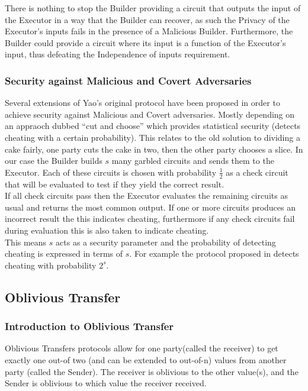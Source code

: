 \documentclass[a4paper,10pt]{article}
\begin{document}
				There is nothing to stop the Builder providing a circuit that outputs the input of the Executor in a way that the Builder can recover, as such the Privacy of the Executor's inputs fails in the presence of a Malicious Builder. Furthermore, the Builder could provide a circuit where its input is a function of the Executor's input, thus defeating the Independence of inputs requirement.


			\subsubsection{Security against Malicious and Covert Adversaries}
				Several extensions of Yao's original protocol have been proposed in order to achieve security against Malicious and Covert adversaries. Mostly depending on an appraoch dubbed ``cut and choose'' which provides statistical security (detects cheating with a certain probability). This relates to the old solution to dividing a cake fairly, one party cuts the cake in two, then the other party chooses a slice. In our case the Builder builds $s$ many garbled circuits and sends them to the Executor. Each of these circuits is chosen with probability $\frac{1}{2}$ as a check circuit that will be evaluated to test if they yield the correct result.\\

				If all check circuits pass then the Executor evaluates the remaining circuits as usual and returns the most common output. If one or more circuits produces an incorrect result the this indicates cheating, furthermore if any check circuits fail during evaluation this is also taken to indicate cheating.\\

				This means $s$ acts as a security parameter and the probability of detecting cheating is expressed in terms of $s$. For example the protocol proposed in \cite{Lindell_CnC_2014} detects cheating with probability $2^s$.


		\subsection{Oblivious Transfer} \label{OT_Intro}	
			\subsubsection{Introduction to Oblivious Transfer}
				Oblivious Transfers protocols allow for one party(called the receiver) to get exactly one out-of two (and can be extended to out-of-n) values from another party (called the Sender). The receiver is oblivious to the other value(s), and the Sender is oblivious to which value the receiver received.\\
\end{document}
